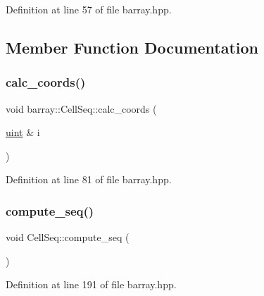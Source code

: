 Definition at line 57 of file barray.\+hpp.



\subsection{Member Function Documentation}
\mbox{\label{classbarray_1_1_cell_seq_a6054321ba5a2e0ba3c0953ef08828994}} 
\subsubsection{\texorpdfstring{calc\+\_\+coords()}{calc\_coords()}}
{\footnotesize\ttfamily void barray\+::\+Cell\+Seq\+::calc\+\_\+coords (\begin{DoxyParamCaption}\item[{\hyperlink{namespacebarray_af9756a31953db233f80a9cfe1ef31c32}{uint} \&}]{i }\end{DoxyParamCaption})\hspace{0.3cm}{\ttfamily [inline]}}



Definition at line 81 of file barray.\+hpp.

\mbox{\label{classbarray_1_1_cell_seq_a6588fe1ad4e37f7a845386eca46c13c2}} 
\subsubsection{\texorpdfstring{compute\+\_\+seq()}{compute\_seq()}}
{\footnotesize\ttfamily void Cell\+Seq\+::compute\+\_\+seq (\begin{DoxyParamCaption}{ }\end{DoxyParamCaption})\hspace{0.3cm}{\ttfamily [inline]}}



Definition at line 191 of file barray.\+hpp.

\mbox{\label{classbarray_1_1_cell_seq_a12235ff9c4a0183ed477679b61c4a19a}} 
